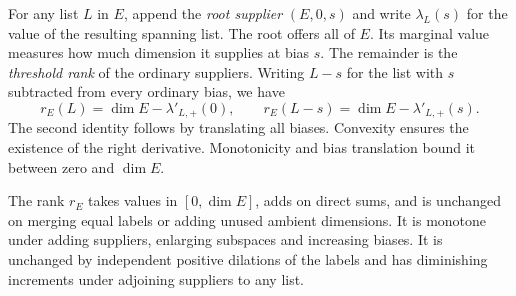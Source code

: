 For any list $L$ in $E$, append the \emph{root supplier} $(E,0,s)$ and
write $\lambda_L(s)$ for the value of the resulting spanning list. The
root offers all of $E$. Its marginal value measures how much dimension
it supplies at bias $s$. The remainder is the \emph{threshold rank}
of the ordinary suppliers. Writing $L-s$ for the list with $s$
subtracted from every ordinary bias, we have
\begin{equation}\label{flag:capdef}
 r_E(L)=\dim E-\lambda'_{L,+}(0),\qquad
 r_E(L-s)=\dim E-\lambda'_{L,+}(s).
\end{equation}
The second identity follows by translating all biases. Convexity
ensures the existence of the right derivative. Monotonicity and bias
translation bound it between zero and $\dim E$.

\begin{lemma}\label{flag:capacity}
The rank $r_E$ takes values in $[0,\dim E]$, adds on direct sums, and is
unchanged on merging equal labels or adding unused ambient dimensions.
It is monotone under adding suppliers, enlarging subspaces and increasing
biases. It is unchanged by independent positive dilations of the labels
and has diminishing increments under adjoining suppliers to any list.
\end{lemma}

